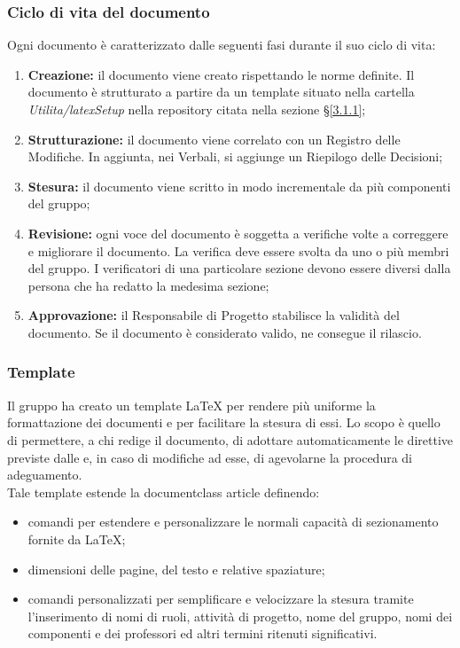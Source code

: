 \subsubsection{Ciclo di vita del documento}
Ogni documento è caratterizzato dalle seguenti fasi durante il suo ciclo di vita:
\begin{enumerate}
	\item \textbf{Creazione:} il documento viene creato rispettando le norme definite. Il documento è strutturato a partire da un template situato nella cartella \textit{Utilita/latexSetup} nella repository citata nella sezione §\ref{3.1.1};
	\item \textbf{Strutturazione:} il documento viene correlato con un Registro delle Modifiche. In aggiunta, nei Verbali, si aggiunge un Riepilogo delle Decisioni;
	\item \textbf{Stesura:} il documento viene scritto in modo incrementale da più componenti del gruppo;
	\item \textbf{Revisione:} ogni voce del documento è soggetta a verifiche volte a correggere e migliorare il documento. La verifica deve essere svolta da uno o più membri del gruppo. I verificatori di una particolare sezione devono essere diversi dalla persona che ha redatto la medesima sezione;
	\item \textbf{Approvazione:} il Responsabile di Progetto stabilisce la validità del documento. Se il documento è considerato valido, ne consegue il rilascio.
\end{enumerate}

\subsubsection{Template}
Il gruppo ha creato un template \LaTeX{} per rendere più uniforme la formattazione dei documenti e per facilitare la stesura di essi. Lo scopo è quello di permettere, a chi redige il documento, di adottare automaticamente le direttive previste dalle \NdPv{} e, in caso di modifiche ad esse, di agevolarne la procedura di adeguamento. \\
Tale template estende la documentclass article definendo:
\begin{itemize}
	\item comandi per estendere e personalizzare le normali capacità di sezionamento fornite da \LaTeX ;
	\item dimensioni delle pagine, del testo e relative spaziature;
	\item comandi personalizzati per semplificare e velocizzare la stesura tramite l'inserimento di nomi di ruoli, attività di progetto, nome del gruppo, nomi dei componenti e dei professori ed altri termini ritenuti significativi. 
\end{itemize}







